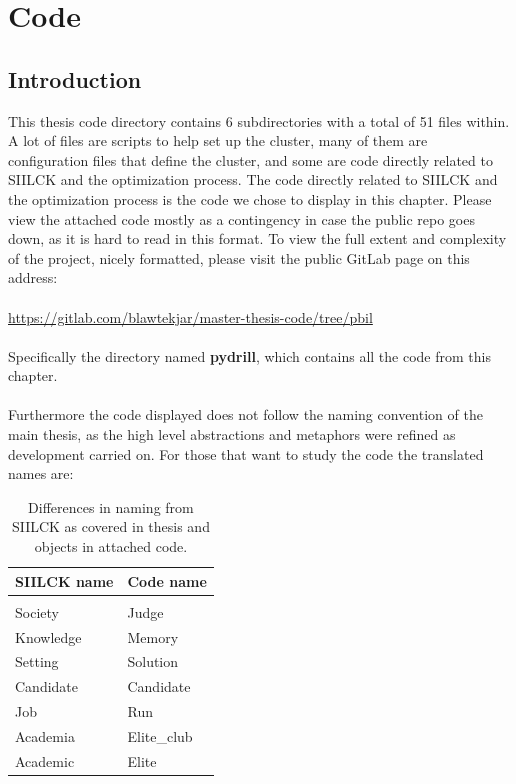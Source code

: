 \documentclass[a4paper,english]{report}
\begin{document}
\chapter{Code}
\section{Introduction}
This thesis code directory contains 6 subdirectories with a total of 51 files within. A lot of files are scripts to help set up the cluster, many of them are configuration files that define the cluster, and some are code directly related to SIILCK and the optimization process. The code directly related to SIILCK and the optimization process is the code we chose to display in this chapter. Please view the attached code mostly as a contingency in case the public repo goes down, as it is hard to read in this format. To view the full extent and complexity of the project, nicely formatted, please visit the public GitLab page on this address:
\\
\\
\href{https://gitlab.com/blawtekjar/master-thesis-code/tree/pbil}{https://gitlab.com/blawtekjar/master-thesis-code/tree/pbil}
\\
\\
Specifically the directory named \textbf{pydrill}, which contains all the code from this chapter.
\\
\\
Furthermore the code displayed does not follow the naming convention of the main thesis, as the high level abstractions and metaphors were refined as development carried on. For those that want to study the code the translated names are:
\begin{table}[H]
	\centering
	\caption{Differences in naming from SIILCK as covered in thesis and objects in attached code.}
	\label{table:code_names}
	\begin{tabular}{ll}
		\\
		\multicolumn{1}{l}{\bfseries SIILCK name} & \multicolumn{1}{l}{\bfseries Code name} \\ \hline \\
		Society& Judge \\
		Knowledge & Memory \\
		Setting & Solution \\
		Candidate & Candidate \\
		Job & Run \\
		Academia & Elite\_club \\
		Academic & Elite \\
	\end{tabular}
\end{table}
\end{document}
